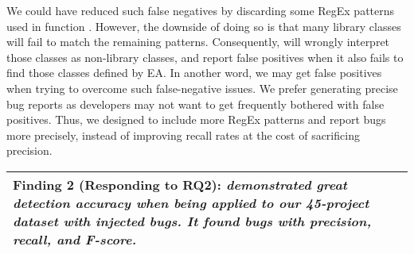 We could have reduced such false negatives by discarding some RegEx patterns used in function . However, the downside of doing so is that 
many library classes will fail to match the remaining patterns. Consequently, \tool will wrongly interpret those classes as non-library classes, and report false positives when it also fails to find those classes defined by EA. 
In another word, we may get false positives when trying to overcome such false-negative issues. We prefer generating precise bug reports as developers may not want to get frequently bothered  with false positives. Thus, we designed \tool to include more RegEx patterns and report bugs more precisely, instead of improving recall rates at the cost of sacrificing precision. 




\vspace{0.5em}
\noindent\begin{tabular}{|p{13.6cm}|}
	\hline
	\textbf{Finding 2 (Responding to RQ2):} \emph{\tool demonstrated great detection accuracy when being applied to our 45-project dataset with injected bugs. It found bugs with \precision precision, \recall recall, and \fscore F-score. }
	\\
	\hline
\end{tabular}

